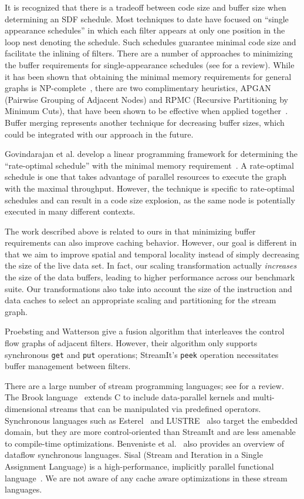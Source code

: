 \documentclass{sigplanconf}
\begin{document}
It is recognized that there is a tradeoff between code size and buffer
size when determining an SDF schedule.  Most techniques to date have
focused on ``single appearance schedules'' in which each filter
appears at only one position in the loop nest denoting the schedule.
Such schedules guarantee minimal code size and facilitate the inlining
of filters.  There are a number of approaches to minimizing the buffer
requirements for single-appearance schedules (see
\cite{bhattacharyya99synthesis} for a review).  While it has been
shown that obtaining the minimal memory requirements for general
graphs is NP-complete~\cite{Bhatta97}, there are two complimentary
heuristics, APGAN (Pairwise Grouping of Adjacent Nodes) and RPMC
(Recursive Partitioning by Minimum Cuts), that have been shown to be
effective when applied together~\cite{Bhatta97}.  Buffer
merging\cite{murt1999x3,murt2000x2} represents another technique for
decreasing buffer sizes, which could be integrated with our approach
in the future.

Govindarajan et al. develop a linear programming framework for
determining the ``rate-optimal schedule'' with the minimal memory
requirement~\cite{GGD94}.  A rate-optimal schedule is one that takes
advantage of parallel resources to execute the graph with the maximal
throughput.  However, the technique is specific to rate-optimal
schedules and can result in a code size explosion, as the same node
is potentially executed in many different contexts.

The work described above is related to ours in that minimizing buffer
requirements can also improve caching behavior.  However, our goal is
different in that we aim to improve spatial and temporal locality
instead of simply decreasing the size of the live data set.  In fact,
our scaling transformation actually {\it increases} the size of the
data buffers, leading to higher performance across our benchmark
suite.  Our transformations also take into account the size of the
instruction and data caches to select an appropriate scaling and
partitioning for the stream graph.

Proebsting and Watterson \cite{pro96} give a fusion algorithm that
interleaves the control flow graphs of adjacent filters.  However,
their algorithm only supports synchronous {\tt get} and {\tt put}
operations; StreamIt's {\tt peek} operation necessitates buffer
management between filters.

There are a large number of stream programming languages; see
\cite{survey97} for a review.  The Brook language~\cite{Buck04}
extends C to include data-parallel kernels and multi-dimensional
streams that can be manipulated via predefined operators.  Synchronous
languages such as Esterel~\cite{esterel92} and LUSTRE~\cite{lustre}
also target the embedded domain, but they are more control-oriented
than StreamIt and are less amenable to compile-time optimizations.
Benveniste et al.~\cite{benveniste93dataflow} also provides an
overview of dataflow synchronous languages.  Sisal (Stream and
Iteration in a Single Assignment Language) is a high-performance,
implicitly parallel functional language~\cite{sisal}.  We are not
aware of any cache aware optimizations in these stream languages.
\end{document}
